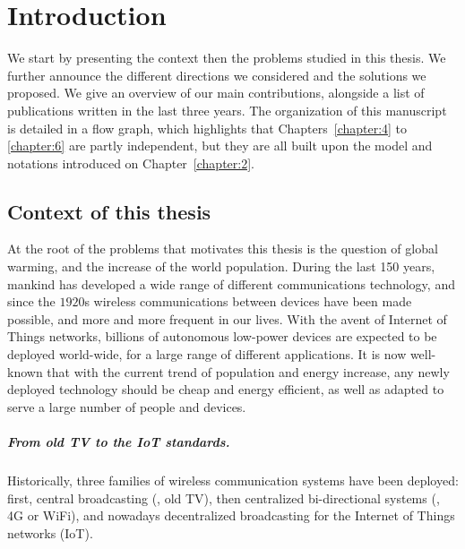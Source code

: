 
\chapter{Introduction}
\label{chapter:1}


\abstractStartChapter{}%
%
We start by presenting the context then the problems studied in this thesis.
We further announce the different directions we considered and the solutions we proposed.
We give an overview of our main contributions, alongside a list of publications written in the last three years.
%
The organization of this manuscript is detailed in a flow graph, which highlights that Chapters~\ref{chapter:4} to \ref{chapter:6} are partly independent, but they are all built upon the model and notations introduced on Chapter~\ref{chapter:2}.

\minitocStartChapter{}

\graphicspath{{2-Chapters/1-Chapter/Images/}}


\section{Context of this thesis}
\label{sec:1:problems}

At the root of the problems that motivates this thesis is the question of global warming, and the increase of the world population.
During the last 150 years, mankind has developed a wide range of different communications technology, and since the $1920$s wireless communications between devices have been made possible, and more and more frequent in our lives.
With the avent of Internet of Things networks, billions of autonomous low-power devices are expected to be deployed world-wide, for a large range of different applications.
It is now well-known that with the current trend of population and energy increase, any newly deployed technology should be
cheap and energy efficient,
as well as adapted to serve a large number of people and devices.


\paragraph{From old TV to the IoT standards.}
%
Historically, three families of wireless communication systems have been deployed: first, central broadcasting (\eg, old TV), then centralized bi-directional systems (\eg, 4G or WiFi), and nowadays decentralized broadcasting for the Internet of Things networks (IoT).

